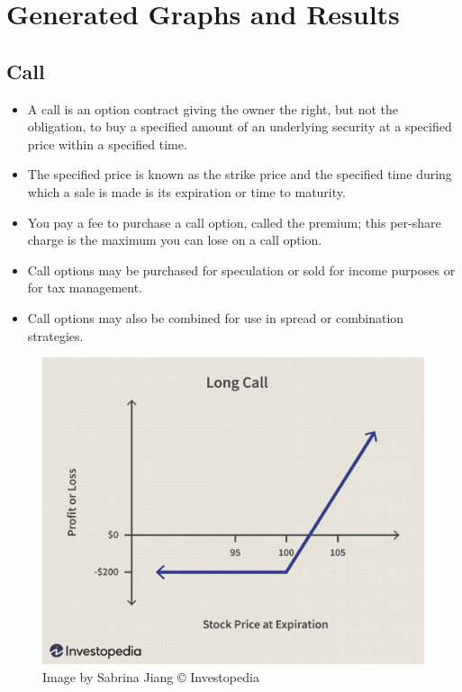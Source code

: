 \newpage

\hypertarget{generated-graphs-and-results}{%
\section{Generated Graphs and
Results}\label{generated-graphs-and-results}}

\begin{multicols}{2}

\hypertarget{call}{%
\subsection{Call}\label{call}}

\begin{itemize}
\tightlist
\item
  A call is an option contract giving the owner the right, but not the
  obligation, to buy a specified amount of an underlying security at a
  specified price within a specified time.
\item
  The specified price is known as the strike price and the specified
  time during which a sale is made is its expiration or time to
  maturity.
\item
  You pay a fee to purchase a call option, called the premium; this
  per-share charge is the maximum you can lose on a call option.
\item
  Call options may be purchased for speculation or sold for income
  purposes or for tax management.
\item
  Call options may also be combined for use in spread or combination
  strategies.
\end{itemize}

\begin{figure}
\centering
\includegraphics{call.png}
\caption{Image by Sabrina Jiang © Investopedia}
\end{figure}


\end{multicols}
